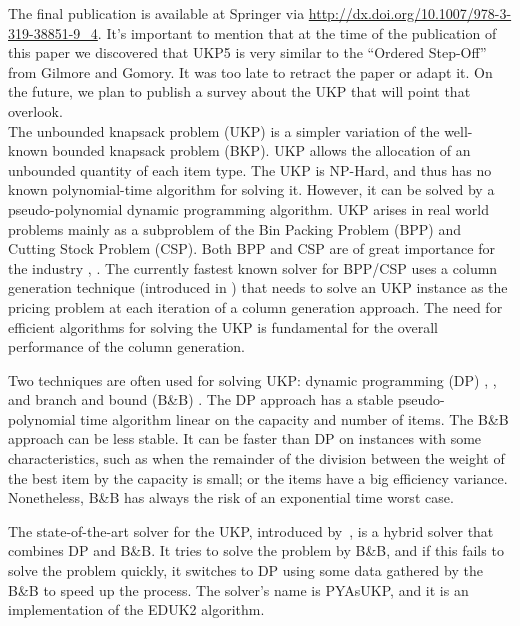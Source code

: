 \documentclass[runningheads,a4paper]{llncs}
\begin{document}
The final publication is available at Springer via \url{http://dx.doi.org/10.1007/978-3-319-38851-9_4}. It's important to mention that at the time of the publication of this paper we discovered that UKP5 is very similar to the ``Ordered Step-Off'' from Gilmore and Gomory\cite[p. 15]{gg66}. It was too late to retract the paper or adapt it. On the future, we plan to publish a survey about the UKP that will point that overlook.\\

The unbounded knapsack problem (UKP) is a simpler variation of the well-known bounded knapsack problem (BKP).
UKP allows the allocation of an unbounded quantity of each item type.
The UKP is NP-Hard, and thus has no known polynomial-time algorithm for solving it. 
However, it can be solved by a pseudo-polynomial dynamic programming algorithm.
UKP arises in real world problems mainly as a subproblem of the Bin Packing Problem (BPP) and Cutting Stock Problem (CSP). 
Both BPP and CSP are of great importance for the industry \cite{survey2014}, \cite{gg-1,gg-2}. 
The currently fastest known solver for BPP/CSP\cite{belov,survey2014}
uses a column generation technique (introduced in \cite{gg-1}) that needs to solve an UKP instance as the pricing problem at each iteration of a column generation approach. 
The need for efficient algorithms for solving the UKP is fundamental for the overall performance of the column generation.

Two techniques are often used for solving UKP: dynamic programming (DP) \cite{eduk}, \cite[p. 214]{gar72}, \cite[p. 311]{tchu} and branch and bound (B\&B) \cite{mtu2}. 
The DP approach has a stable pseudo-polynomial time algorithm linear on the capacity and number of items. 
The B\&B approach can be less stable. 
It can be faster than DP on instances with some characteristics, such as when the remainder of the division between the weight of the best item by the capacity is small; or the items have a big efficiency variance. Nonetheless, B\&B has always the risk of an exponential time worst case.

The state-of-the-art solver for the UKP, introduced by~\cite{pya}, is a hybrid solver that combines DP and B\&B. 
It tries to solve the problem by B\&B, and if this fails to solve the problem quickly, it switches to DP using some data gathered by the B\&B to speed up the process. 
The solver's name is PYAsUKP, and it is an implementation of the EDUK2 algorithm.
\end{document}
